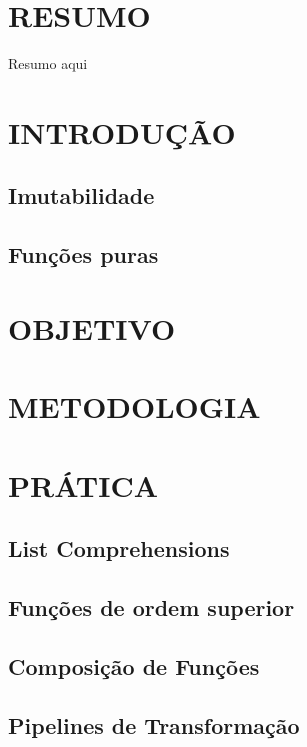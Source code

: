 \documentclass[date,twocolumn,a4paper]{ppgem}
\begin{document}
\thispagestyle{plain}
\makeheader




\section*{RESUMO}
Resumo aqui

\section{INTRODUÇÃO}
\subsection{Imutabilidade}
\subsection{Funções puras}

\section{OBJETIVO}


\section{METODOLOGIA}

\section{PRÁTICA}

\subsection{List Comprehensions}
\subsection{Funções de ordem superior}
\subsection{Composição de Funções}
\subsection{Pipelines de Transformação}
\end{document}
